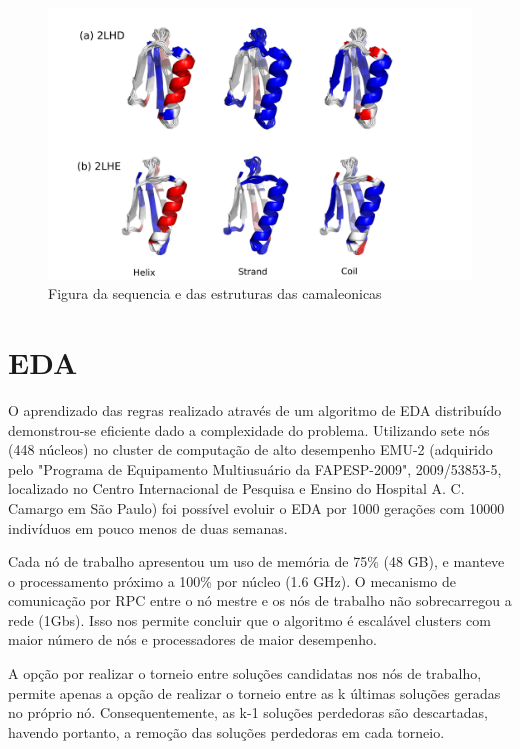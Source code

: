 \begin{figure}
  \centering
  \includegraphics[width=1\textwidth]{figures/camel_2lhd_2lhe.pdf}
  \caption{Figura da sequencia e das estruturas das camaleonicas}
        \label{fig:camel_2lhd_2lhe}
\end{figure}


\section{EDA}

O aprendizado das regras realizado através de um algoritmo de EDA distribuído demonstrou-se eficiente dado a complexidade do problema. Utilizando sete nós (448 núcleos) no cluster de computação de alto desempenho EMU-2 (adquirido pelo "Programa de Equipamento  Multiusuário da FAPESP-2009", 2009/53853-5, localizado no Centro Internacional de Pesquisa e Ensino do Hospital A. C. Camargo em  São Paulo) foi possível evoluir o EDA por 1000 gerações com 10000 indivíduos em pouco menos de duas semanas.

Cada nó de trabalho apresentou um uso de memória de 75\% (48 GB), e manteve o processamento próximo a 100\% por núcleo (1.6 GHz). O mecanismo de comunicação por RPC entre o nó mestre e os nós de trabalho não sobrecarregou a rede (1Gbs). Isso nos permite concluir que o algoritmo é escalável clusters com maior número de nós e processadores de maior desempenho.

A opção por realizar o torneio entre soluções candidatas nos nós de trabalho, permite apenas a opção de realizar o torneio entre as k últimas soluções geradas no próprio nó. Consequentemente, as k-1 soluções perdedoras são descartadas, havendo portanto, a remoção das soluções perdedoras em cada torneio. 

